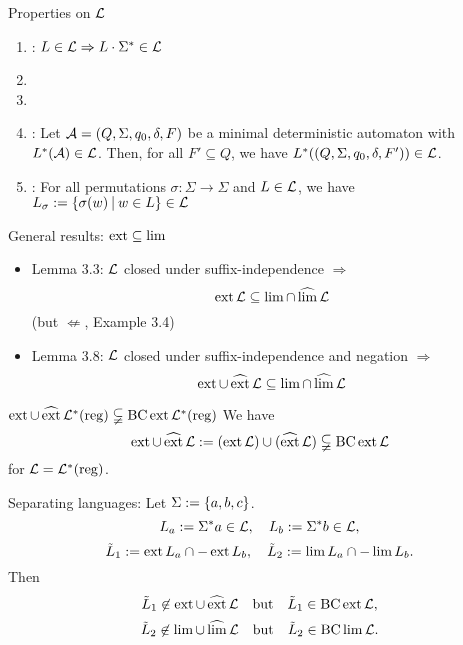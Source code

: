 \documentclass[
	handout,
	notheorems,noamsthm]{beamer}
\begin{document}
\begin{frame}[<+->]{Properties on $\mathcal{L}$}
\begin{enumerate}
\item {}: $L \in \mathcal{L} \Rightarrow L \cdot \Sigma^* \in \mathcal{L}$
\item {}
\item {}
\item {}:
Let $\mathcal{A} = (Q,\Sigma,q_0,\delta,F)$ be a minimal deterministic automaton with $L^*(\mathcal{A}) \in \mathcal{L}$. Then, for all $F' \subseteq Q$, we have $L^*((Q,\Sigma,q_0,\delta,F')) \in \mathcal{L}$.
\item {}: For all permutations $\sigma : \Sigma \rightarrow \Sigma$ and $L \in \mathcal{L}$, we have $L_\sigma := \Set{\sigma(w)}{w \in L} \in \Lang$
\end{enumerate}
\end{frame}

\begin{frame}[<+->]{General results: $\operatorname{ext} \subseteq \lim$}
\begin{itemize}
\item Lemma 3.3: $\mathcal{L}$ closed under suffix-independence $\Rightarrow$
\[ \operatorname{ext} \mathcal{L} \subseteq \lim \cap \operatorname{\widehat{lim}} \mathcal{L} \]
(but $\not\Leftarrow$, Example 3.4)
\item Lemma 3.8: $\mathcal{L}$ closed under suffix-independence and negation $\Rightarrow$
\[ \operatorname{ext} \cup \operatorname{\widehat{ext}} \mathcal{L} \subseteq \lim \cap \operatorname{\widehat{lim}} \mathcal{L} \]
\end{itemize}
\end{frame}

\begin{frame}[<+->]{$\operatorname{ext} \cup \operatorname{\widehat{ext}} \mathcal{L}^*(\textup{\textrm{reg}}) \subsetneqq \operatorname{BC} \operatorname{ext} \mathcal{L}^*(\textup{\textrm{reg}})$}
We have
\[ \operatorname{ext} \cup \operatorname{\widehat{ext}} \mathcal{L} := (\operatorname{ext} \mathcal{L}) \cup (\operatorname{\widehat{ext}} \mathcal{L}) \subsetneqq \operatorname{BC} \operatorname{ext} \mathcal{L} \]
for $\mathcal{L} = \mathcal{L}^*(\textup{\textrm{reg}})$.

Separating languages: Let $\Sigma := \Set{a,b,c}$.
\[ L_a := \Sigma^* a \in \mathcal{L}, \ \ \ L_b := \Sigma^* b \in \mathcal{L}, \]
\[ \tilde L_1 := \ext L_a \cap -\ext L_b, \ \ \ \tilde L_2 := \lim L_a \cap -\lim L_b . \]
Then
\[ \tilde L_1 \not\in \ext \cup \dext \Lang \ \ \text{ but } \ \ \tilde L_1 \in \BC \ext \Lang , \]
\[ \tilde L_2 \not\in \lim \cup \dlim \Lang \ \ \text{ but } \ \ \tilde L_2 \in \BC \lim \Lang . \]
\end{frame}
\end{document}
